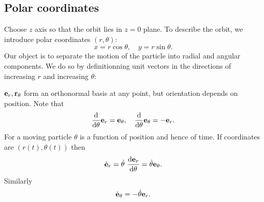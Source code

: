 \subsection{Polar coordinates}
Choose $z$ axis so that the orbit lies in $z=0$ plane. To describe the orbit, we introduce polar coordinates $(r, \theta)$:
\[
  x = r\cos\theta, \quad y = r\sin \theta.
\]
Our object is to separate the motion of the particle into radial and angular components. We do so by definitionning unit vectors in the directions of increasing $r$ and increasing $\theta$:
\begin{center}
\end{center}
$ {\bf e}_r,{\bf r}_\theta $ form an orthonormal basis at any point, but orientation depends on position. Note that 
\[
    \frac{\mathrm{d}}{\mathrm{d}\theta}{\bf e}_r = {\bf e}_\theta ,\quad \frac{\mathrm{d}}{\mathrm{d}\theta}{\bf e}_\theta=-{\bf e}_r. 
\]
For a moving particle $ \theta $ is a function of position and hence of time. If coordinates are $ (r(t),\theta(t)) $ then
\[
    \dot{\bfe}_r = \dot{\theta}\ \frac{\mathrm{d}\bfe_r}{\mathrm{d}\theta} = \dot{\theta}\bfe_\theta .
\]
Similarly
\[
    \dot{{\bf e}}_\theta = - \dot{\theta}{\bf e}_r.
\]

